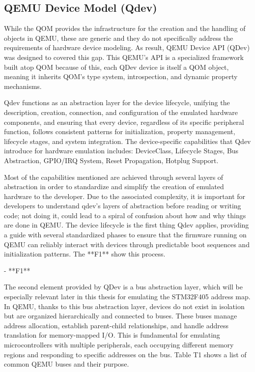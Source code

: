 \subsection{QEMU Device Model (Qdev)}
\label{chap:qemu_qdev}

While the QOM provides the infrastructure for the creation and the handling 
of objects in QEMU, these are generic and they do not specifically address the 
requirements of hardware device modeling. As result, QEMU Device API (QDev) 
was designed to covered this gap. This QEMU's API is a specialized framework built 
atop QOM because of this, each QDev device is itself a QOM object, meaning it inherits 
QOM's type system, introspection, and dynamic property mechanisms.

Qdev functions as an abstraction layer for the device lifecycle, unifying the 
description, creation, connection, and configuration of the emulated hardware components,
and ensuring that every device, regardless of its specific peripheral function, follows consistent patterns for initialization, 
property management, lifecycle stages, and system integration. The device-specific 
capabilities that Qdev introduce for hardware emulation includes: DeviceClass, 
Lifecycle Stages, Bus Abstraction, GPIO/IRQ System, Reset Propagation, Hotplug Support.

Most of the capabilities mentioned are achieved through several layers of 
abstraction in order to standardize and simplify the creation of emulated hardware to 
the developer. Due to the associated complexity, it is important for developers to 
understand qdev's layers of abstraction before reading or writing code; not doing it, 
could lead to a spiral of confusion about how and why things are done in QEMU. 
The device lifecycle is the first thing Qdev applies, providing a guide with several 
standardized phases to ensure that the firmware running on QEMU can reliably interact 
with devices through predictable boot sequences and initialization patterns. 
The **F1** show this process.

- **F1**

The second element provided by QDev is a bus abstraction layer, which will be 
especially relevant later in this thesis for emulating the STM32F405 address map. 
In QEMU, thanks to this bus abstraction layer, devices do not exist in isolation 
but are organized hierarchically and connected to buses. These buses manage 
address allocation, establish parent-child relationships, and handle address translation 
for memory-mapped I/O. This is fundamental for emulating microcontrollers with 
multiple peripherals, each occupying different memory regions and responding to 
specific addresses on the bus. Table T1 shows a list of common QEMU buses 
and their purpose.

